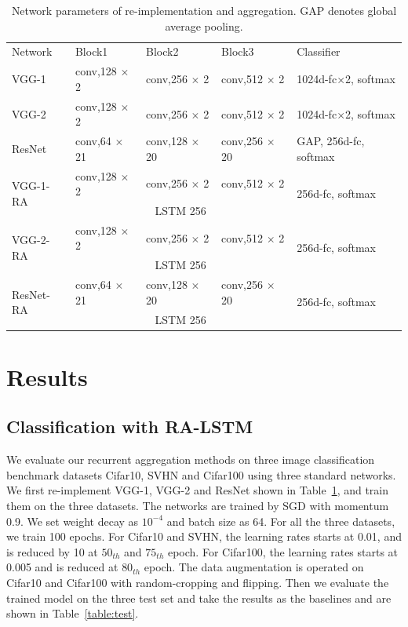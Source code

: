 \documentclass[runningheads]{llncs}
\begin{document}
\setlength{\tabcolsep}{4pt}
\linespread{1.2}
\begin{table}
\begin{center}
\caption{
Network parameters of re-implementation and aggregation. GAP denotes global average pooling.
}
\label{table:struc}
\begin{tabular}{l|l|l|l|l}
\hline\noalign{\smallskip}
Network& Block1 & Block2 & Block3 & Classifier\\
\noalign{\smallskip}
\hline
\noalign{\smallskip}
VGG-1 & conv,128 $\times$ 2 & conv,256 $\times$ 2 & conv,512 $\times$ 2 & 1024d-fc$\times$2, softmax \\
\hline
VGG-2 & conv,128 $\times$ 2 & conv,256 $\times$ 2 & conv,512 $\times$ 2 & 1024d-fc$\times$2, softmax \\
\hline
ResNet & conv,64 $\times$ 21 & conv,128 $\times$ 20 & conv,256 $\times$ 20 & GAP, 256d-fc, softmax \\
\hline
\multirow{2}{*}{VGG-1-RA} & conv,128 $\times$ 2 & conv,256 $\times$ 2 & conv,512 $\times$ 2 & \multirow{2}{3cm}{256d-fc, softmax} \\
\cline{2-4}
					 & \multicolumn{3}{c|}{LSTM 256} \\
\hline
\multirow{2}{*}{VGG-2-RA} & conv,128 $\times$ 2 & conv,256 $\times$ 2 & conv,512 $\times$ 2 & \multirow{2}{3cm}{256d-fc, softmax} \\
\cline{2-4}
					 & \multicolumn{3}{c|}{LSTM 256} \\
\hline
\multirow{2}{*}{ResNet-RA} & conv,64 $\times$ 21 & conv,128 $\times$ 20 & conv,256 $\times$ 20 &\multirow{2}{3cm}{256d-fc, softmax} \\
\cline{2-4}
					& \multicolumn{3}{c|}{LSTM 256}\\
\hline
\end{tabular}
\end{center}
\end{table}
\setlength{\tabcolsep}{1.4pt}

\section{Results}

\subsection{Classification with RA-LSTM}

We evaluate our recurrent aggregation methods on three image classification benchmark datasets Cifar10, SVHN and Cifar100 using three standard networks. We first re-implement VGG-1, VGG-2 and ResNet shown in Table~\ref{table:struc}, and train them on the three datasets. The networks are trained by SGD with momentum 0.9. We set weight decay as $10^{-4}$ and batch size as 64. For all the three datasets, we train 100 epochs. For Cifar10 and SVHN, the learning rates starts at 0.01, and is reduced by 10 at $50_{th}$ and $75_{th}$ epoch. For Cifar100, the learning rates starts at 0.005 and is reduced at $80_{th}$ epoch. The data augmentation is operated on Cifar10 and Cifar100 with random-cropping and flipping. Then we evaluate the trained model on the three test set and take the results as the baselines and are shown in Table~\ref{table:test}.
\end{document}

